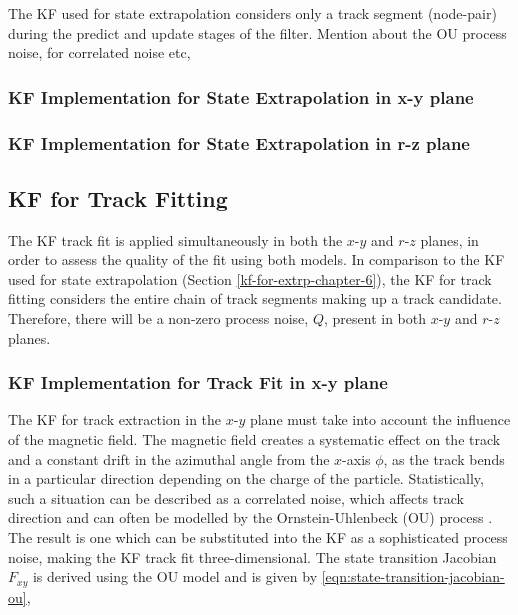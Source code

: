 The KF used for state extrapolation considers only a track segment (node-pair) during the predict and update stages of the filter.
Mention about the OU process noise, for correlated noise etc, 



\subsubsection{KF Implementation for State Extrapolation in x-y plane}

\subsubsection{KF Implementation for State Extrapolation in r-z plane}









\subsection{KF for Track Fitting}

The KF track fit is applied simultaneously in both the $x$-$y$ and $r$-$z$ planes, in order to assess the quality of the fit using both models. In comparison to the KF used for state extrapolation (Section \ref{kf-for-extrp-chapter-6}), the KF for track fitting considers the entire chain of track segments making up a track candidate. Therefore, there will be a non-zero process noise, $Q$, present in both $x$-$y$ and $r$-$z$ planes.

\subsubsection{KF Implementation for Track Fit in x-y plane}

The KF for track extraction in the $x$-$y$ plane must take into account the influence of the magnetic field. The magnetic field creates a systematic effect on the track and a constant drift in the azimuthal angle from the $x$-axis $\phi$, as the track bends in a particular direction depending on the charge of the particle. Statistically, such a situation can be described as a correlated noise, which affects track direction and can often be modelled by the Ornstein-Uhlenbeck (OU) process \cite{OU}. The result is one which can be substituted into the KF as a sophisticated process noise, making the KF track fit three-dimensional. The state transition Jacobian $F_{xy}$ is derived using the OU model \cite{OU} and is given by \eqref{eqn:state-transition-jacobian-ou},

